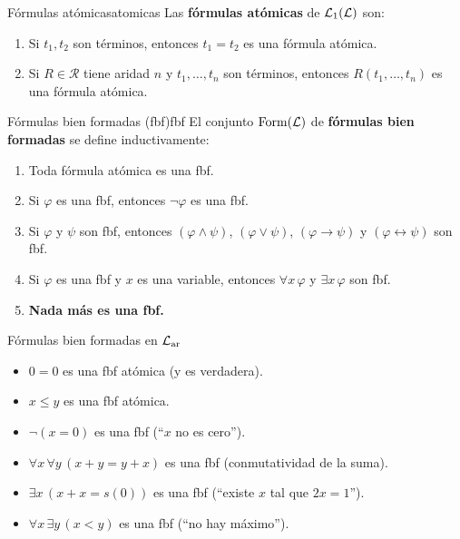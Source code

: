\begin{definicion}{Fórmulas atómicas}{atomicas}
Las \textbf{fórmulas atómicas} de $\mathcal{L}_1(\mathcal{L})$ son:
\begin{enumerate}[leftmargin=2em]
  \item Si $t_1, t_2$ son términos, entonces $t_1 = t_2$ es una fórmula atómica.
  \item Si $R \in \mathcal{R}$ tiene aridad $n$ y $t_1, \ldots, t_n$ son términos, entonces $R(t_1, \ldots, t_n)$ es una fórmula atómica.
\end{enumerate}
\end{definicion}

\begin{definicion}{Fórmulas bien formadas (fbf)}{fbf}
El conjunto $\mathrm{Form}(\mathcal{L})$ de \textbf{fórmulas bien formadas} se define inductivamente:
\begin{enumerate}[leftmargin=2em]
  \item Toda fórmula atómica es una fbf.
  \item Si $\varphi$ es una fbf, entonces $\neg \varphi$ es una fbf.
  \item Si $\varphi$ y $\psi$ son fbf, entonces $(\varphi \wedge \psi)$, $(\varphi \vee \psi)$, $(\varphi \to \psi)$ y $(\varphi \leftrightarrow \psi)$ son fbf.
  \item Si $\varphi$ es una fbf y $x$ es una variable, entonces $\forall x\, \varphi$ y $\exists x\, \varphi$ son fbf.
  \item \textbf{Nada más es una fbf.}
\end{enumerate}
\end{definicion}

\begin{ejemplo}{Fórmulas bien formadas en $\mathcal{L}_{\mathrm{ar}}$}{}
\begin{itemize}
  \item $0 = 0$ es una fbf atómica (y es verdadera).
  \item $x \leq y$ es una fbf atómica.
  \item $\neg(x = 0)$ es una fbf (``$x$ no es cero'').
  \item $\forall x\, \forall y\, (x + y = y + x)$ es una fbf (conmutatividad de la suma).
  \item $\exists x\, (x + x = s(0))$ es una fbf (``existe $x$ tal que $2x = 1$'').
  \item $\forall x\, \exists y\, (x < y)$ es una fbf (``no hay máximo'').
\end{itemize}
\end{ejemplo}

